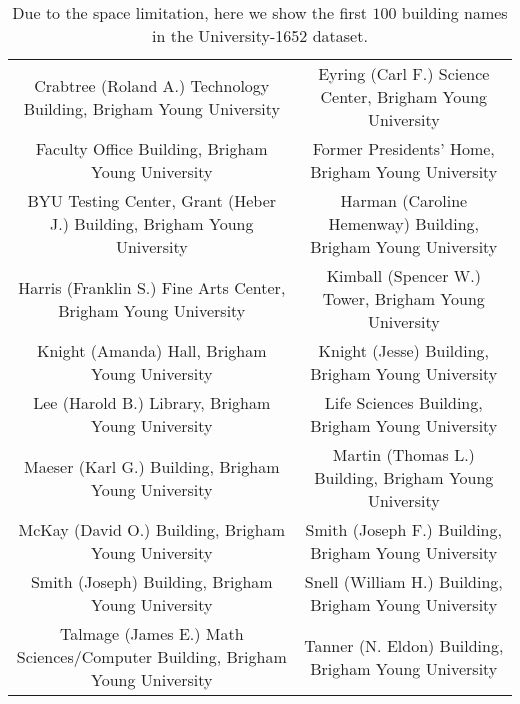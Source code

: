 \documentclass[sigconf]{acmart}
\begin{document}
\begin{table*}
\begin{center}
\begin{tabular}{c|c}
Crabtree (Roland A.) Technology Building, Brigham Young University & Eyring (Carl F.) Science Center, Brigham Young University\\
Faculty Office Building, Brigham Young University & Former Presidents' Home, Brigham Young University\\
BYU Testing Center, Grant (Heber J.) Building, Brigham Young University & Harman (Caroline Hemenway) Building, Brigham Young University\\
Harris (Franklin S.) Fine Arts Center, Brigham Young University & Kimball (Spencer W.) Tower, Brigham Young University\\
Knight (Amanda) Hall, Brigham Young University & Knight (Jesse) Building, Brigham Young University\\
Lee (Harold B.) Library, Brigham Young University & Life Sciences Building, Brigham Young University\\
Maeser (Karl G.) Building, Brigham Young University & Martin (Thomas L.) Building, Brigham Young University\\
McKay (David O.) Building, Brigham Young University & Smith (Joseph F.) Building, Brigham Young University\\
Smith (Joseph) Building, Brigham Young University & Snell (William H.) Building, Brigham Young University\\
Talmage (James E.) Math Sciences/Computer Building, Brigham Young University & Tanner (N. Eldon) Building, Brigham Young University\\
\hline
\end{tabular}
\end{center}
\caption{Due to the space limitation, here we show the first $100$ building names in the University-1652 dataset.
}
\label{table:BuildingName}
\end{table*} 
\end{document}
